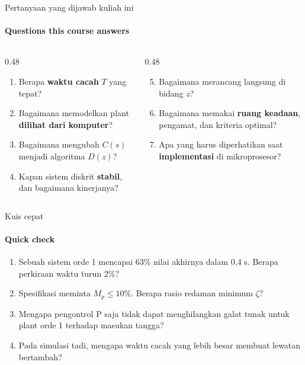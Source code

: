 \documentclass[aspectratio=169,10pt]{beamer}
\begin{document}
\begin{frame}{Pertanyaan yang dijawab kuliah ini}
	\framesubtitle{Questions this course answers}
	\begin{columns}[T]
		\begin{column}{0.48\textwidth}
			\begin{enumerate}
				\item Berapa \textbf{waktu cacah} $T$ yang tepat? 
				\item Bagaimana memodelkan plant \textbf{dilihat dari komputer}? 
				\item Bagaimana mengubah $C(s)$ menjadi algoritma $D(z)$? 
				\item Kapan sistem diskrit \textbf{stabil}, dan bagaimana kinerjanya? 
			\end{enumerate}
		\end{column}
		\begin{column}{0.48\textwidth}
			\begin{enumerate}\setcounter{enumi}{4}
				\item Bagaimana merancang langsung di bidang $z$? 
				\item Bagaimana memakai \textbf{ruang keadaan}, pengamat, dan kriteria optimal? 
				\item Apa yang harus diperhatikan saat \textbf{implementasi} di mikroprosesor? 
			\end{enumerate}
		\end{column}
	\end{columns}
	\vspace{0.3cm}
\end{frame}

\begin{frame}{Kuis cepat}
	\framesubtitle{Quick check}
	\begin{enumerate}
		\item Sebuah sistem orde 1 mencapai 63\% nilai akhirnya dalam 0,4 s. Berapa perkiraan waktu turun 2\%?\\
		\item Spesifikasi meminta $M_p \leq 10\%$. Berapa rasio redaman minimum $\zeta$?\\
		\item Mengapa pengontrol P saja tidak dapat menghilangkan galat tunak untuk plant orde 1 terhadap masukan tangga?\\
		\item Pada simulasi tadi, mengapa waktu cacah yang lebih besar membuat lewatan bertambah?\\
	\end{enumerate}
\end{frame}
\end{document}

